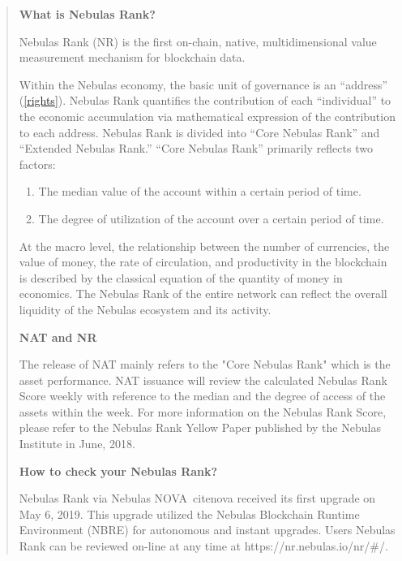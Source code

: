 \begin{quote}
	\textbf{What is Nebulas Rank?}
		
	Nebulas Rank (NR) is the first on-chain, native, multidimensional value measurement mechanism for blockchain data.

	Within the Nebulas economy, the basic unit of governance is an “address” (\ref{rights}). Nebulas Rank quantifies the contribution of each “individual” to the economic accumulation via mathematical expression of the contribution to each address. Nebulas Rank is divided into “Core Nebulas Rank” and “Extended Nebulas Rank.” “Core Nebulas Rank” primarily reflects two factors:

	\begin{enumerate}
		\item The median value of the account within a certain period of time.
		\item The degree of utilization of the account over a certain period of time.
	\end{enumerate}

	At the macro level, the relationship between the number of currencies, the value of money, the rate of circulation, and productivity in the blockchain is described by the classical equation of the quantity of money in economics. The Nebulas Rank of the entire network can reflect the overall liquidity of the Nebulas ecosystem and its activity.

	\vspace{2em}

	\textbf{NAT and NR}

	The release of NAT mainly refers to the "Core Nebulas Rank" which is the asset performance. NAT issuance will review the calculated Nebulas Rank Score weekly with reference to the median and the degree of access of the assets within the week. For more information on the Nebulas Rank Score, please refer to the Nebulas Rank Yellow Paper published by the Nebulas Institute in June, 2018.

	\vspace{2em}

	\textbf{How to check your Nebulas Rank?}

Nebulas Rank via Nebulas NOVA~cite{nova} received its first upgrade on  May 6, 2019. This upgrade utilized the Nebulas Blockchain Runtime Environment (NBRE) for autonomous and instant upgrades. Users Nebulas Rank can be reviewed on-line at any time at https://nr.nebulas.io/nr/#/.
\end{quote}

